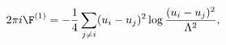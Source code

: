 \begin{equation}
2\pi i \F^{(1)} = 
-{1 \over 4} \sum _{j\not=i} (u_i-u_j)^2 \log {(u_i - u_j)^2 \over \Lambda ^2},\label{1loop}
\end{equation}

